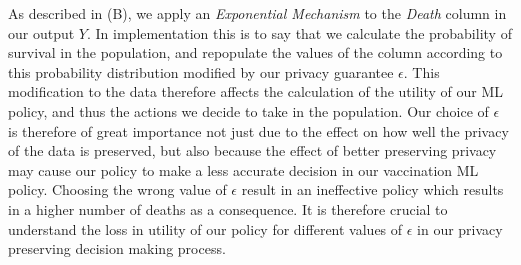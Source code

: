 \documentclass{article}
\begin{document}
\begin{itemize}
As described in (B), we apply an \textit{Exponential Mechanism} to the \textit{Death} column in our output $Y$. In implementation this is to say that we calculate the probability of survival in the population, and repopulate the values of the column according to this probability distribution modified by our privacy guarantee $\epsilon$. This modification to the data therefore affects the calculation of the utility of our ML policy, and thus the actions we decide to take in the population. Our choice of $\epsilon$ is therefore of great importance not just due to the effect on how well the privacy of the data is preserved, but also because the effect of better preserving privacy may cause our policy to make a less accurate decision in our vaccination ML policy. Choosing the wrong value of $\epsilon$ result in an ineffective policy which results in a higher number of deaths as a consequence. It is therefore crucial to understand the loss in utility of our policy for different values of $\epsilon$ in our privacy preserving decision making process.




\end{itemize}
\end{document}
